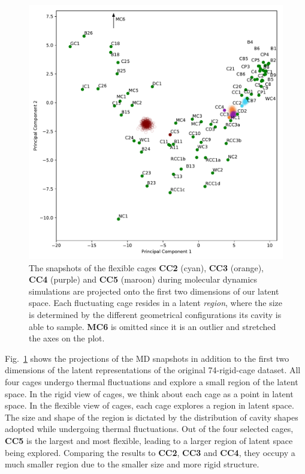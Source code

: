 \documentclass[journal=jacsat,manuscript=article]{achemso}
\begin{document}
{\begin{figure}
\centering
	\includegraphics[width=\columnwidth]{../PCA_latent_cage_space_with_flexible_cages_2D.pdf}
	\caption{\color{red}The snapshots of the flexible cages \textbf{CC2} (cyan), \textbf{CC3} (orange), \textbf{CC4} (purple) and \textbf{CC5} (maroon) during molecular dynamics simulations are projected onto the first two dimensions of our latent space. Each fluctuating cage resides in a latent \emph{region}, where the size is determined by the different geometrical configurations its cavity is able to sample. \textbf{MC6} is omitted since it is an outlier and stretched the axes on the plot.
	} \label{fig:pca_space_with_flex}
\end{figure}

Fig.~\ref{fig:pca_space_with_flex} shows the projections of the MD snapshots in addition to the first two dimensions of the latent representations of the original 74-rigid-cage dataset. All four cages undergo thermal fluctuations and explore a small region of the latent space. 
In the rigid view of cages, we think about each cage as a point in latent space. In the flexible view of cages, each cage explores a region in latent space. The size and shape of the region is dictated by the distribution of cavity shapes adopted while undergoing thermal fluctuations. Out of the four selected cages, \textbf{CC5} is the largest and most flexible, leading to a larger region of latent space being explored. Comparing the results to \textbf{CC2}, \textbf{CC3} and \textbf{CC4}, they occupy a much smaller region due to the smaller size and more rigid structure.

}
\end{document}
